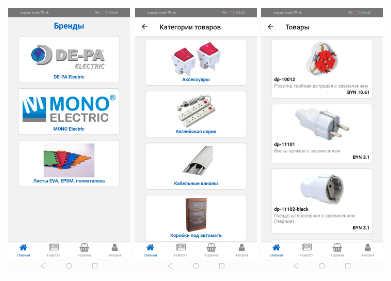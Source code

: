\begin{figure}[!p]\centering
    \begin{minipage}{0.24\textwidth}
        \centering

        \includegraphics[height=7cm]
        {images/android/item-brands.jpg}
    \end{minipage}
    \begin{minipage}{0.24\textwidth}
        \centering

        \includegraphics[height=7cm]
        {images/android/item-categories.jpg}
    \end{minipage}
    \begin{minipage}{0.24\textwidth}
        \centering

        \includegraphics[height=7cm]
        {images/android/items.jpg}
    \end{minipage}
    \begin{minipage}{0.24\textwidth}
        \centering


\end{minipage}
\end{figure}
